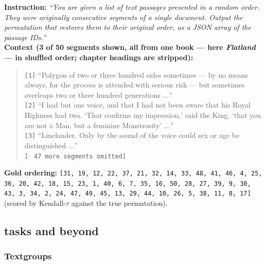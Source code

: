 \textbf{Instruction:} \emph{``You are given a list of text passages presented in a random order. They
were originally consecutive segments of a single document. Output the permutation that restores them
to their original order, as a JSON array of the passage IDs.''}\\
\textbf{Context (3 of 50 segments shown, all from one book --- here \emph{Flatland} --- in shuffled
order; chapter headings are stripped):}
\begin{quote}\small
\texttt{[1]} ``Polygon of two or three hundred sides sometimes --- by no means always, for the process
is attended with serious risk --- but sometimes overleaps two or three hundred generations $\dots$''\\
\texttt{[2]} ``I had but one voice, and that I had not been aware that his Royal Highness had two.
`That confirms my impression,' said the King, `that you are not a Man, but a feminine Monstrosity'
$\dots$''\\
\texttt{[3]} ``Linelander. Only by the sound of the voice could sex or age be distinguished
$\dots$''\\
\texttt{[$\cdot$ 47 more segments omitted]}
\end{quote}
\textbf{Gold ordering:} \texttt{[31, 19, 12, 22, 37, 21, 32, 14, 33, 48, 41, 46, 4, 25, 36, 20, 42,
18, 15, 23, 1, 40, 6, 7, 35, 16, 50, 28, 27, 39, 9, 30, 43, 3, 34, 2, 24, 47, 49, 45, 13, 29, 44, 10,
26, 5, 38, 11, 8, 17]}\quad(scored by Kendall-$\tau$ against the true permutation).

\subsection{ tasks and beyond}

\subsubsection{Textgroups}

